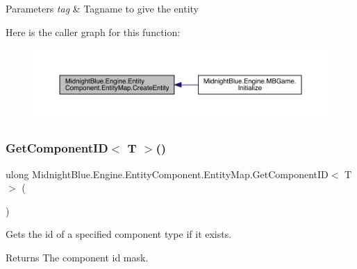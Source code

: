 \begin{DoxyParams}{Parameters}
{\em tag} & Tagname to give the entity\\
\hline
\end{DoxyParams}
Here is the caller graph for this function\+:
\nopagebreak
\begin{figure}[H]
\begin{center}
\leavevmode
\includegraphics[width=350pt]{class_midnight_blue_1_1_engine_1_1_entity_component_1_1_entity_map_acb6bf0e0819a14f67678fe5d79582579_icgraph}
\end{center}
\end{figure}
\hypertarget{class_midnight_blue_1_1_engine_1_1_entity_component_1_1_entity_map_ae4068faba4d37d5443ac5cf7a3e7b6dd}{}\label{class_midnight_blue_1_1_engine_1_1_entity_component_1_1_entity_map_ae4068faba4d37d5443ac5cf7a3e7b6dd} 
\subsubsection{\texorpdfstring{Get\+Component\+I\+D$<$ T $>$()}{GetComponentID< T >()}}
{\footnotesize\ttfamily ulong Midnight\+Blue.\+Engine.\+Entity\+Component.\+Entity\+Map.\+Get\+Component\+ID$<$ T $>$ (\begin{DoxyParamCaption}{ }\end{DoxyParamCaption})\hspace{0.3cm}{\ttfamily [inline]}}



Gets the id of a specified component type if it exists. 

\begin{DoxyReturn}{Returns}
The component id mask.
\end{DoxyReturn}

